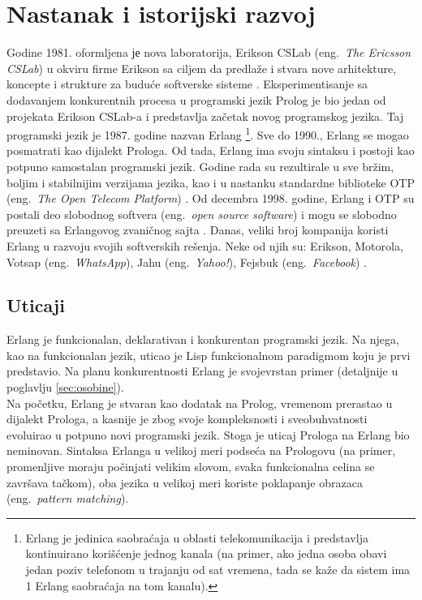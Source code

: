 \documentclass[a4paper]{article}
\begin{document}
\section{Nastanak i istorijski razvoj}
\label{sec:nastanak}
Godine 1981. oformljena је nova laboratorija, Erikson CSLab (eng.~{\em The Ericsson CSLab}) u okviru firme Erikson sa
ciljem da predlaže i stvara nove arhitekture, koncepte i strukture za buduće softverske sisteme \cite{phdthesis}.
Eksperimentisanje sa dodavanjem konkurentnih procesa u programski jezik Prolog je bio jedan
od projekata Erikson CSLab-a i predstavlja začetak novog programskog jezika.
Taj programski jezik je 1987. godine nazvan Erlang
\footnote{ Erlang je jedinica saobraćaja u oblasti telekomunikacija 
i predstavlja kontinuirano korišćenje jednog kanala 
(na primer, ako jedna osoba obavi jedan poziv telefonom u trajanju od sat vremena, 
tada se kaže da sistem ima 1 Erlang saobraćaja na tom kanalu).}.    
Sve do 1990., Erlang se mogao posmatrati kao dijalekt Prologa. Od tada, Erlang
ima svoju sintaksu i postoji kao potpuno samostalan programski jezik.
Godine rada su rezultirale u sve bržim, boljim i stabilnijim verzijama jezika, kao
i u nastanku standardne biblioteke OTP (eng.~{\em The Open Telecom Platform}) \cite{phdthesis}.
Od decembra 1998. godine, Erlang i OTP su postali deo slobodnog softvera (eng.~{\em open source software})
i mogu se slobodno preuzeti sa Erlangovog zvaničnog sajta \cite{sajt}.
Danas, veliki broj kompanija koristi Erlang u razvoju
svojih softverskih rešenja. Neke od njih su: Erikson, Motorola, Votsap (eng.~{\em WhatsApp}), 
Jahu (eng.~{\em Yahoo!}), Fejsbuk (eng.~{\em Facebook}) \cite{sajt}.


\subsection{Uticaji}
\label{subsec:uticaji}
Erlang je funkcionalan, deklarativan i konkurentan programski jezik.
Na njega, kao na funkcionalan jezik, uticao je Lisp funkcionalnom paradigmom koju je 
prvi predstavio. Na planu konkurentnosti Erlang je svojevrstan primer (detaljnije u poglavlju \ref{sec:osobine}). \\ 

Na početku, Erlang je stvaran kao dodatak na Prolog, vremenom prerastao u 
dijalekt Prologa, a kasnije je zbog svoje kompleksnosti i sveobuhvatnosti evoluirao
u potpuno novi programski jezik. Stoga je uticaj Prologa na Erlang bio 
neminovan. Sintaksa Erlanga u velikoj meri podseća na Prologovu 
(na primer, promenljive moraju počinjati velikim slovom, 
svaka funkcionalna celina se završava tačkom), oba jezika u velikoj meri koriste poklapanje obrazaca
(eng.~{\em pattern matching}). \\
\end{document}
